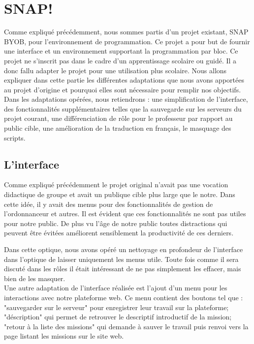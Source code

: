 \section{SNAP!}
\label{solution SNAP}
Comme expliqué précédemment, nous sommes partis d'un projet existant, SNAP BYOB, pour l'environnement de programmation. Ce projet a pour but de fournir une interface et un environnement supportant la programmation par bloc. Ce projet ne s'inscrit pas dans le cadre d'un apprentissage scolaire ou guidé. Il a donc fallu adapter le projet pour une utilisation plus scolaire. Nous allons expliquer dans cette partie les différentes adaptations que nous avons apportées au projet d'origine et pourquoi elles sont nécessaire pour remplir nos objectifs.\\

Dans les adaptations opérées, nous retiendrons : une simplification de l'interface, des fonctionnalités supplémentaires telles que la sauvegarde sur les serveurs du projet courant, une différenciation de rôle pour le professeur par rapport au public cible, une amélioration de la traduction en français, le masquage des scripts.

\subsection{L'interface}
\label{interface}
Comme expliqué précédemment le projet original n'avait pas une vocation didactique de groupe et avait un publique cible plus large que le notre. Dans cette idée, il y avait des menus pour des fonctionnalités de gestion de l'ordonnanceur et autres. Il est évident que ces fonctionnalités ne sont pas utiles pour notre public. De plus vu l'âge de notre public toutes distractions qui peuvent être évitées améliorent sensiblement la productivité de ces derniers.

Dans cette optique, nous avons opéré un nettoyage en profondeur de l'interface dans l'optique de laisser uniquement les menus utile. Toute fois comme il sera discuté dans les rôles il était intéressant de ne pas simplement les effacer, mais bien de les masquer.\\

Une autre adaptation de l'interface réalisée est l'ajout d'un menu pour les interactions avec notre plateforme web. Ce menu contient des boutons tel que : "sauvegarder sur le serveur" pour enregistrer leur travail sur la plateforme; "déscription" qui permet de retrouver le descriptif introductif de la mission; "retour à la liste des missions" qui demande à sauver le travail puis renvoi vers la page listant les missions sur le site web.

